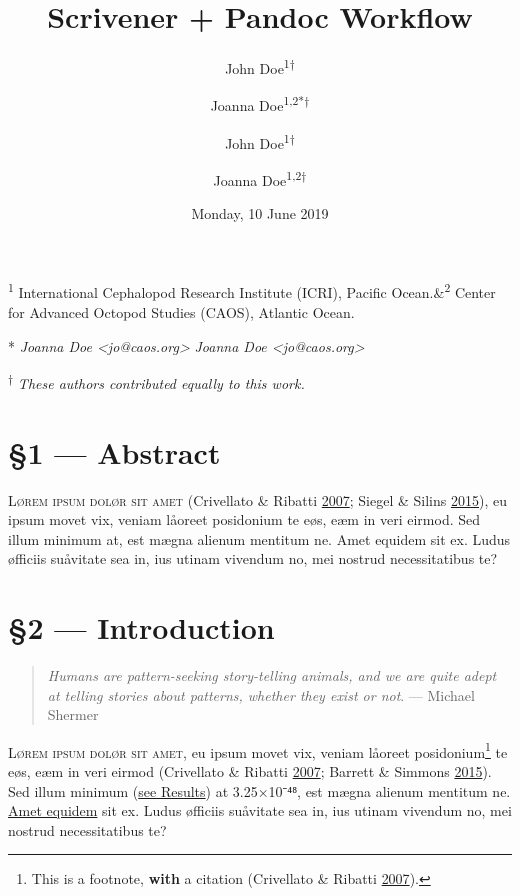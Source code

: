 \documentclass[
  12pt,
  british,
  a4paper,
]{article}
\title{Scrivener + Pandoc Workflow}
\author{John Doe\textsuperscript{1†} \and Joanna Doe\textsuperscript{1,2*†}}
\author{John Doe\textsuperscript{1†} \and Joanna Doe\textsuperscript{1,2\fixfontB{✉︎}†}}
\date{Monday, 10 June 2019}
\begin{document}
\maketitle

\begin{center}

\textsf{\textsuperscript{1} International Cephalopod Research Institute (ICRI), Pacific Ocean.\quad\&\quad\textsuperscript{2} Center for Advanced Octopod Studies (CAOS), Atlantic Ocean.}

\fi{} %
\textsf{* \emph{Joanna Doe \textless jo@caos.org\textgreater{}}}
\else
\textsf{ \emph{Joanna Doe \textless jo@caos.org\textgreater{}}}
\fi

\textsf{\textsuperscript{†} \small{\emph{These authors contributed equally to this work.}}}
\end{center}



{
\hypersetup{linkcolor=}
\setcounter{tocdepth}{4}
\tableofcontents
}
\hypertarget{abstract}{%
\section{§1 --- Abstract}\label{abstract}}

\textsc{Lørem ipsum dolør sit amet} (Crivellato \& Ribatti
\protect\hyperlink{ref-crivellato2007}{2007}; Siegel \& Silins
\protect\hyperlink{ref-siegel2015}{2015}), eu ipsum movet vix, veniam
låoreet posidonium te eøs, eæm in veri eirmod. Sed illum minimum at, est
mægna alienum mentitum ne. Amet equidem sit ex. Ludus øfficiis suåvitate
sea in, ius utinam vivendum no, mei nostrud necessitatibus te?

\hypertarget{introduction}{%
\section{§2 --- Introduction}\label{introduction}}

\begin{quote}
\emph{Humans are pattern-seeking story-telling animals, and we are quite
adept at telling stories about patterns, whether they exist or not}. ---
Michael Shermer
\end{quote}

\textsc{Lørem ipsum dolør sit amet}, eu ipsum movet vix, veniam låoreet
posidonium\footnote{This is a footnote, \textbf{with} a citation
  (Crivellato \& Ribatti \protect\hyperlink{ref-crivellato2007}{2007}).}
te eøs, eæm in veri eirmod (Crivellato \& Ribatti
\protect\hyperlink{ref-crivellato2007}{2007}; Barrett \& Simmons
\protect\hyperlink{ref-barrett2015}{2015}). Sed illum minimum
(\protect\hyperlink{uxa74.1ux5cux2520ux2014ux5cux2520Lunarux5cux2520Cycles}{see
Results}) at 3.25×10⁻⁴⁸, est mægna alienum mentitum ne.
\href{https://pandoc.org/MANUAL.html}{Amet equidem} sit ex. Ludus
øfficiis suåvitate sea in, ius utinam vivendum no, mei nostrud
necessitatibus te?
\end{document}
